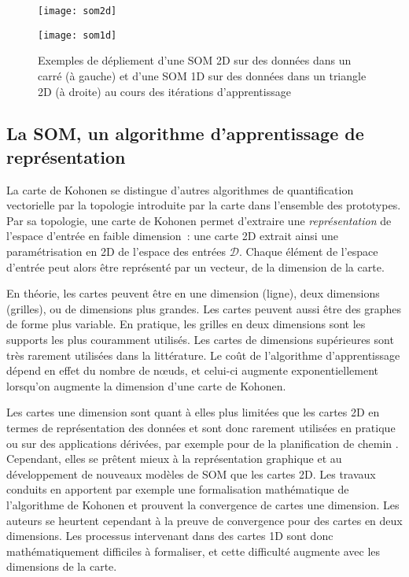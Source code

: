 \documentclass[../main]{subfiles}
\begin{document}
\begin{figure}
\begin{minipage}{0.5\textwidth}
\centering
\texttt{[image: som2d]}
\end{minipage}
\begin{minipage}{0.5\textwidth}
\centering
\texttt{[image: som1d]}
\end{minipage}
\caption{Exemples de dépliement d'une SOM 2D sur des données dans un carré (à gauche) et d'une SOM 1D sur des données dans un triangle 2D (à droite) au cours des itérations d'apprentissage \parencite{Kohonen1995SelfOrganizingM}\label{fig:som1d}}
\end{figure}
    
\subsection{La SOM, un algorithme d'apprentissage de représentation}

La carte de Kohonen se distingue d'autres algorithmes de quantification vectorielle par la topologie introduite par la carte dans l'ensemble des prototypes.
Par sa topologie, une carte de Kohonen permet d'extraire une \emph{représentation} de l'espace d'entrée en faible dimension~: une carte 2D extrait ainsi une paramétrisation en 2D de l'espace des entrées $\mathcal{D}$.
Chaque élément de l'espace d'entrée peut alors être représenté par un vecteur, de la dimension de la carte.

En théorie, les cartes peuvent être en une dimension (ligne), deux dimensions (grilles), ou de dimensions plus grandes. Les cartes peuvent aussi être des graphes de forme plus variable. 
En pratique, les grilles en deux dimensions sont les supports les plus couramment utilisés. Les cartes de dimensions supérieures sont très rarement utilisées dans la littérature. 
Le coût de l'algorithme d'apprentissage dépend en effet du nombre de n\oe{}uds, et celui-ci augmente exponentiellement lorsqu'on augmente la dimension d'une carte de Kohonen.

Les cartes une dimension sont quant à elles plus limitées que les cartes 2D en termes de représentation des données et sont donc rarement utilisées en pratique ou sur des applications dérivées, par exemple pour de la planification de chemin \parencite{FrezzaBuet2020SelforganizingMI}.
Cependant, elles se prêtent mieux à la représentation graphique et au développement de nouveaux modèles de SOM que les cartes 2D.
Les travaux conduits en \cite{Cottrell1998TheoreticalAO, fort_soms_2006, cottrell_theoretical_2016} apportent par exemple une formalisation mathématique de l'algorithme de Kohonen et prouvent la convergence de cartes une dimension. Les auteurs se heurtent cependant à la preuve de convergence pour des cartes en deux dimensions. 
Les processus intervenant dans des cartes 1D sont donc mathématiquement difficiles à formaliser, et cette difficulté augmente avec les dimensions de la carte.
\end{document}
